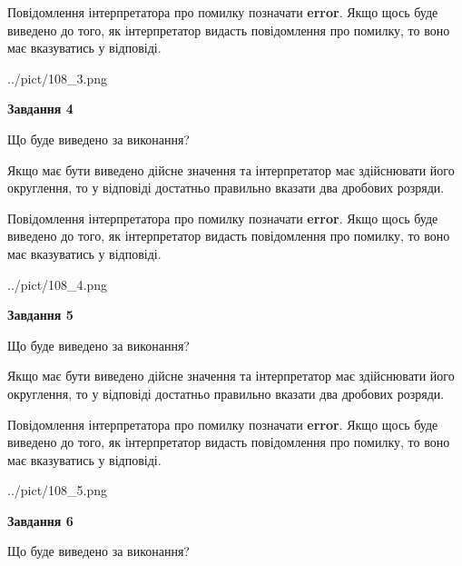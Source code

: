 \documentclass[12pt, ukrainian]{article}
\begin{document}
{\begin {Large}
Повідомлення інтерпретатора про помилку позначати \textbf{error}.
Якщо щось буде виведено до того, як інтерпретатор видасть повідомлення про помилку, 
то воно має вказуватись у відповіді. \par

\begin{center}
	{../pict/108_3.png}
\end{center}
\newpage

{\begin {center}\textbf{Завдання 4}\end {center}}\par
Що буде виведено за виконання? \par

Якщо має бути виведено дійсне значення та інтерпретатор має здійснювати його округлення, 
то у відповіді достатньо правильно вказати два дробових розряди.

Повідомлення інтерпретатора про помилку позначати \textbf{error}.
Якщо щось буде виведено до того, як інтерпретатор видасть повідомлення про помилку, 
то воно має вказуватись у відповіді. \par

\begin{center}
	{../pict/108_4.png}
\end{center}
\newpage

{\begin {center}\textbf{Завдання 5}\end {center}}\par
Що буде виведено за виконання? \par

Якщо має бути виведено дійсне значення та інтерпретатор має здійснювати його округлення, 
то у відповіді достатньо правильно вказати два дробових розряди.

Повідомлення інтерпретатора про помилку позначати \textbf{error}.
Якщо щось буде виведено до того, як інтерпретатор видасть повідомлення про помилку, 
то воно має вказуватись у відповіді. \par

\begin{center}
	{../pict/108_5.png}
\end{center}
\newpage

{\begin {center}\textbf{Завдання 6}\end {center}}\par
Що буде виведено за виконання? \par


\end{Large}}
\end{document}
